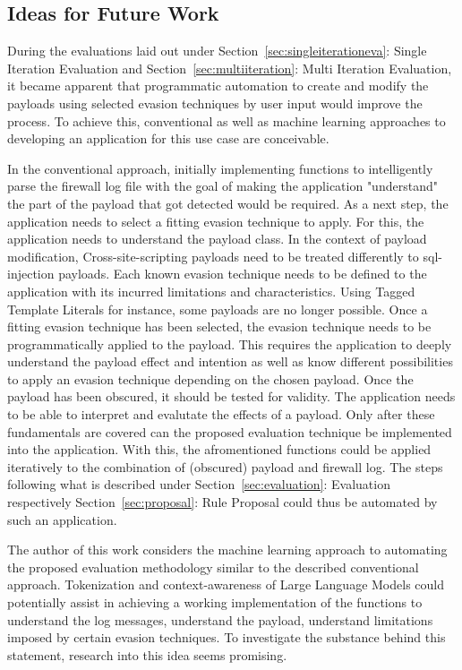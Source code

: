 \subsection{Ideas for Future Work}
During the evaluations laid out under Section~\ref{sec:singleiterationeva}: Single Iteration Evaluation and Section~\ref{sec:multiiteration}: Multi Iteration Evaluation, it became apparent that programmatic automation to create and modify the payloads using selected evasion techniques by user input would improve the process. To achieve this, conventional as well as machine learning approaches to developing an application for this use case are conceivable.

In the conventional approach, initially implementing functions to intelligently parse the firewall log file with the goal of making the application "understand" the part of the payload that got detected would be required. As a next step, the application needs to select a fitting evasion technique to apply. For this, the application needs to understand the payload class. In the context of payload modification, Cross-site-scripting payloads need to be treated differently to sql-injection payloads. Each known evasion technique needs to be defined to the application with its incurred limitations and characteristics. Using Tagged Template Literals for instance, some payloads are no longer possible.
Once a fitting evasion technique has been selected, the evasion technique needs to be programmatically applied to the payload. This requires the application to deeply understand the payload effect and intention as well as know different possibilities to apply an evasion technique depending on the chosen payload. Once the payload has been obscured, it should be tested for validity. The application needs to be able to interpret and evalutate the effects of a payload. Only after these fundamentals are covered can the proposed evaluation technique be implemented into the application. With this, the afromentioned functions could be applied iteratively to the combination of (obscured) payload and firewall log. The steps following what is described under Section~\ref{sec:evaluation}: Evaluation respectively Section~\ref{sec:proposal}: Rule Proposal could thus be automated by such an application.

The author of this work considers the machine learning approach to automating the proposed evaluation methodology similar to the described conventional approach. Tokenization and context-awareness of Large Language Models could potentially assist in achieving a working implementation of the functions to understand the log messages, understand the payload, understand limitations imposed by certain evasion techniques. To investigate the substance behind this statement, research into this idea seems promising. 
